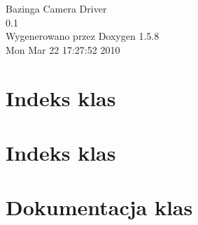 \documentclass[a4paper]{book}
\begin{document}
\begin{titlepage}
\vspace*{7cm}
\begin{center}
{\Large Bazinga Camera Driver \\[1ex]\large 0.1 }\\
\vspace*{1cm}
{\large Wygenerowano przez Doxygen 1.5.8}\\
\vspace*{0.5cm}
{\small Mon Mar 22 17:27:52 2010}\\
\end{center}
\end{titlepage}
\clearemptydoublepage
{}
\tableofcontents
\clearemptydoublepage
{}
\chapter{Indeks klas}

\chapter{Indeks klas}

\chapter{Dokumentacja klas}







\printindex
\end{document}
